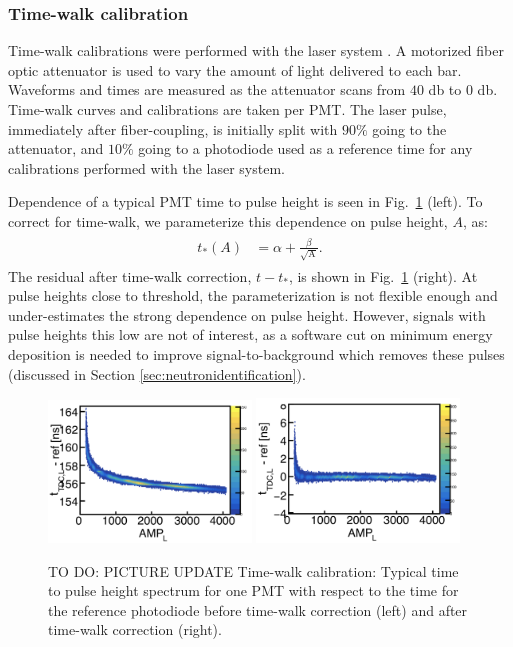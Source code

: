 \documentclass[3p,final,twocolumn]{elsarticle}
\begin{document}
\subsubsection{Time-walk calibration}
Time-walk calibrations were performed with the laser system \cite{band-laser}. A motorized fiber optic attenuator is used to vary
the amount of light delivered to each bar. Waveforms and times are measured as the attenuator scans from $40$ \si{\decibel} to $0$ 
\si{\decibel}. Time-walk curves and calibrations are taken per PMT. The laser pulse, immediately after fiber-coupling, is initially 
split with $90\%$ going to the attenuator, and $10\%$ going to a photodiode used as a reference time for any calibrations 
performed with the laser system.

Dependence of a typical PMT time to pulse height is seen in Fig.~\ref{fig:time_walk} (left). To correct for time-walk, we parameterize 
this dependence on pulse height, $A$, as:
\begin{eqnarray}
	\begin{split}
		t_*(A)	&= \alpha + \frac{\beta}{\sqrt{\textrm{A}}}.				
		\label{eqn:time_walk}
	\end{split}
\end{eqnarray}
The residual after time-walk correction, $t-t_*$, is shown in Fig.~\ref{fig:time_walk} (right). At pulse heights close to threshold, the 
parameterization is not flexible enough and under-estimates the strong dependence on pulse height. However, signals with pulse 
heights this low are not of interest, as a software cut on minimum energy deposition is needed to improve signal-to-background 
which removes these pulses (discussed in Section \ref{sec:neutronidentification}).

\begin{figure}[tbh]
	\centering
		\includegraphics[width=0.48\textwidth]{tw_before.png}
		\includegraphics[width=0.48\textwidth]{tw_after.png}
	\caption{TO DO: PICTURE UPDATE Time-walk calibration: Typical time to pulse height spectrum for one PMT with respect to the time for the reference photodiode before time-walk correction (left) and after time-walk correction (right).}
	\label{fig:time_walk}
\end{figure}
\end{document}
